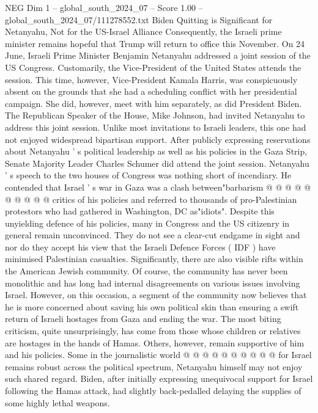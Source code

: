 \begin{textsample}{NEG Dim 1 – global\_south\_2024\_07 – Score 1.00 – global\_south\_2024\_07/111278552.txt}  \label{ex:f1_neg_388}
Biden Quitting is Significant for Netanyahu, Not for the US-Israel Alliance Consequently, the Israeli prime minister remains hopeful that Trump will return to office this November.
On 24 June, Israeli Prime Minister Benjamin Netanyahu addressed a joint session of the US Congress.
Customarily, the Vice-President of the United States attends the session.
This time, however, Vice-President Kamala Harris, was conspicuously absent on the grounds that she had a scheduling conflict with her presidential campaign.
She did, however, meet with him separately, as did President Biden.
The Republican Speaker of the House, Mike Johnson, had invited Netanyahu to address this joint session.
Unlike most invitations to Israeli leaders, this one had not enjoyed widespread bipartisan support.
After publicly expressing reservations about Netanyahu ' s political leadership as well as his policies in the Gaza Strip, Senate Majority Leader Charles Schumer did attend the joint session.
Netanyahu ' s speech to the two houses of Congress was nothing short of incendiary.
He contended that Israel ' s war in Gaza was a clash between"barbarism @ @ @ @ @ @ @ @ @ @ critics of his policies and referred to thousands of pro-Palestinian protestors who had gathered in Washington, DC as"idiots".
Despite this unyielding defence of his policies, many in Congress and the US citizenry in general remain unconvinced.
They do not see a clear-cut endgame in sight and nor do they accept his view that the Israeli Defence Forces ( IDF ) have minimised Palestinian casualties.
Significantly, there are also visible rifts within the American Jewish community.
Of course, the community has never been monolithic and has long had internal disagreements on various issues involving Israel.
However, on this occasion, a segment of the community now believes that he is more concerned about saving his own political skin than ensuring a swift return of Israeli hostages from Gaza and ending the war.
The most biting criticism, quite unsurprisingly, has come from those whose children or relatives are hostages in the hands of Hamas.
Others, however, remain supportive of him and his policies.
Some in the journalistic world @ @ @ @ @ @ @ @ @ @ for Israel remains robust across the political spectrum, Netanyahu himself may not enjoy such shared regard.
Biden, after initially expressing unequivocal support for Israel following the Hamas attack, had slightly back-pedalled delaying the supplies of some highly lethal weapons.

\end{textsample}
